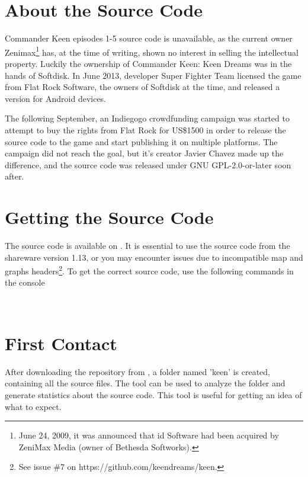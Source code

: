\documentclass[book.tex]{subfiles}
\begin{document}
\label{chapter_software_architecture}
\section{About the Source Code}
Commander Keen episodes 1-5 source code is unavailable, as the current owner Zenimax\footnote{June 24, 2009, it was announced that id Software had been acquired by ZeniMax Media (owner of Bethesda Softworks).} has, at the time of writing, shown no interest in selling the intellectual property. Luckily the ownership of Commander Keen: Keen Dreams was in the hands of Softdisk. In June 2013, developer Super Fighter Team licensed the game from Flat Rock Software, the owners of Softdisk at the time, and released a version for Android devices.\\

\par
The following September, an Indiegogo crowdfunding campaign was started to attempt to buy the rights from Flat Rock for US\$1500 in order to release the source code to the game and start publishing it on multiple platforms. The campaign did not reach the goal, but it’s creator Javier Chavez made up the difference, and the source code was released under GNU GPL-2.0-or-later soon after.


\section{Getting the Source Code}
The source code is available on . It is essential to use the source code from the shareware version 1.13, or you may encounter issues due to incompatible map and graphs headers\footnote{See issue \#7 on https://github.com/keendreams/keen.}. To get the correct source code, use the following commands in the console \\

\par
{}\\

\section{First Contact}
After downloading the repository from , a folder named 'keen' is created, containing all the source files. The  tool can be used to analyze the folder and generate statistics about the source code. This tool is useful for getting an idea of what to expect.\\
\end{document}

